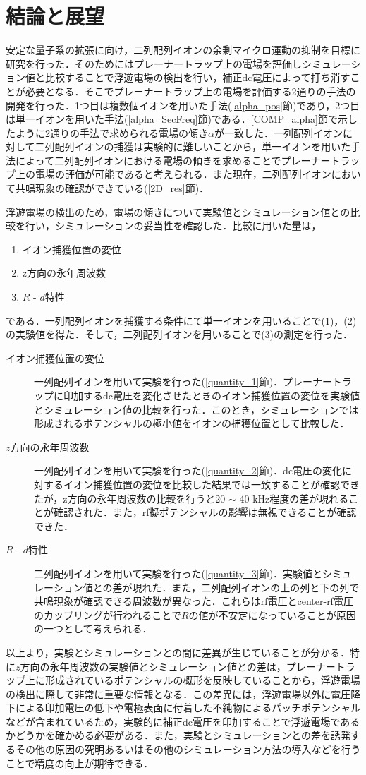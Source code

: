 \chapter{結論と展望}
安定な量子系の拡張に向け，二列配列イオンの余剰マイクロ運動の抑制を目標に研究を行った．そのためにはプレーナートラップ上の電場を評価しシミュレーション値と比較することで浮遊電場の検出を行い，補正dc電圧によって打ち消すことが必要となる．そこでプレーナートラップ上の電場を評価する2通りの手法の開発を行った．1つ目は複数個イオンを用いた手法(\ref{alpha_pos}節)であり，2つ目は単一イオンを用いた手法(\ref{alpha_SecFreq}節)である．\ref{COMP_alpha}節で示したように2通りの手法で求められる電場の傾き$\alpha$が一致した．一列配列イオンに対して二列配列イオンの捕獲は実験的に難しいことから，単一イオンを用いた手法によって二列配列イオンにおける電場の傾きを求めることでプレーナートラップ上の電場の評価が可能であると考えられる．また現在，二列配列イオンにおいて共鳴現象の確認ができている(\ref{2D_res}節)．

浮遊電場の検出のため，電場の傾きについて実験値とシミュレーション値との比較を行い，シミュレーションの妥当性を確認した．比較に用いた量は，
\begin{enumerate}
\item イオン捕獲位置の変位
\item z方向の永年周波数
\item $R$ - $d$特性
\end{enumerate}
である．一列配列イオンを捕獲する条件にて単一イオンを用いることで(1)，(2)の実験値を得た．そして，二列配列イオンを用いることで(3)の測定を行った．
\begin{description}
\item [イオン捕獲位置の変位]
一列配列イオンを用いて実験を行った(\ref{quantity_1}節)．プレーナートラップに印加するdc電圧を変化させたときのイオン捕獲位置の変位を実験値とシミュレーション値の比較を行った．このとき，シミュレーションでは形成されるポテンシャルの極小値をイオンの捕獲位置として比較した．
\item[$z$方向の永年周波数]
一列配列イオンを用いて実験を行った(\ref{quantity_2}節)．dc電圧の変化に対するイオン捕獲位置の変位を比較した結果では一致することが確認できたが，z方向の永年周波数の比較を行うと20 $\sim$ 40 kHz程度の差が現れることが確認された．また，rf擬ポテンシャルの影響は無視できることが確認できた．
\item[$R$ - $d$特性]
二列配列イオンを用いて実験を行った(\ref{quantity_3}節)．実験値とシミュレーション値との差が現れた．また，二列配列イオンの上の列と下の列で共鳴現象が確認できる周波数が異なった．これらはrf電圧とcenter-rf電圧のカップリングが行われることで$R$の値が不安定になっていることが原因の一つとして考えられる．
\end{description}
以上より，実験とシミュレーションとの間に差異が生じていることが分かる．特に$z$方向の永年周波数の実験値とシミュレーション値との差は，プレーナートラップ上に形成されているポテンシャルの概形を反映していることから，浮遊電場の検出に際して非常に重要な情報となる．この差異には，浮遊電場以外に電圧降下による印加電圧の低下や電極表面に付着した不純物によるパッチポテンシャルなどが含まれているため，実験的に補正dc電圧を印加することで浮遊電場であるかどうかを確かめる必要がある．また，実験とシミュレーションとの差を誘発するその他の原因の究明あるいはその他のシミュレーション方法の導入などを行うことで精度の向上が期待できる．

